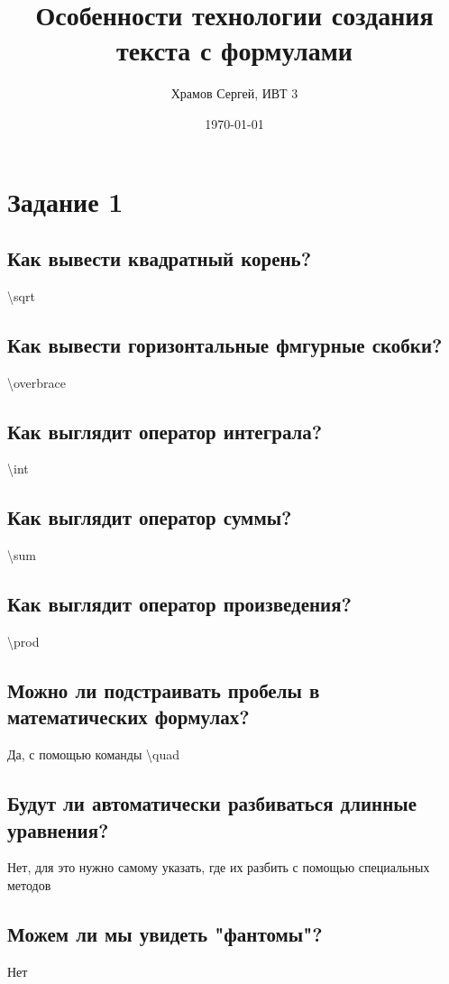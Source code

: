 \documentclass[a4paper,12pt]{article} %
\author{Храмов Сергей, ИВТ 3}
\title{Особенности технологии создания текста с формулами{}}
\date{\today}
\begin{document}
\maketitle
\newpage

\section{Задание 1}

\subsection{Как вывести квадратный корень?}
\textbackslash sqrt

\subsection{Как вывести горизонтальные фмгурные скобки?}
\textbackslash overbrace

\subsection{Как выглядит оператор интеграла?}
\textbackslash int

\subsection{Как выглядит оператор суммы?}
\textbackslash sum

\subsection{Как выглядит оператор произведения?}
\textbackslash prod

\subsection{Можно ли подстраивать пробелы в математических формулах?}
Да, с помощью команды \textbackslash quad

\subsection{Будут ли автоматически разбиваться длинные уравнения?}
Нет, для это нужно самому указать, где их разбить с помощью специальных методов

\subsection{Можем ли мы увидеть "фантомы"?}
Нет
\end{document}
